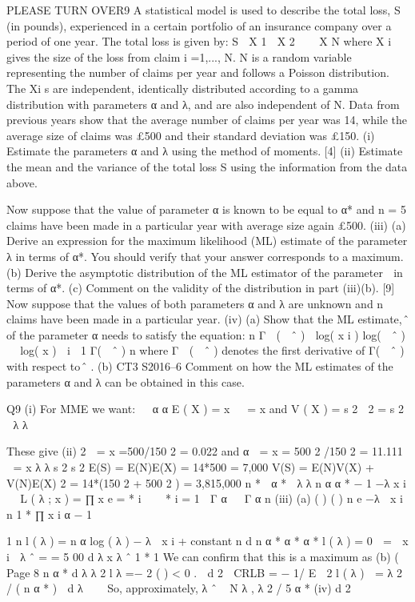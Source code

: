 \documentclass[a4paper,12pt]{article}
\begin{document}
\begin{enumerate}
PLEASE TURN OVER9
A statistical model is used to describe the total loss, S (in pounds), experienced in a
certain portfolio of an insurance company over a period of one year. The total loss is
given by:
S  X 1  X 2    X N
where X i gives the size of the loss from claim i =1,..., N. N is a random variable
representing the number of claims per year and follows a Poisson distribution. The
Xi s are independent, identically distributed according to a gamma distribution with
parameters α and λ, and are also independent of N.
Data from previous years show that the average number of claims per year was 14,
while the average size of claims was £500 and their standard deviation was £150.
(i) Estimate the parameters α and λ using the method of moments.
[4]
(ii) Estimate the mean and the variance of the total loss S using the information
from the data above.

Now suppose that the value of parameter α is known to be equal to α* and
n = 5 claims have been made in a particular year with average size again £500.
(iii)
(a) Derive an expression for the maximum likelihood (ML) estimate of
the parameter λ in terms of α*. You should verify that your answer
corresponds to a maximum.
(b) Derive the asymptotic distribution of the ML estimator of the
parameter  in terms of α*.
(c) Comment on the validity of the distribution in part (iii)(b).
[9]
Now suppose that the values of both parameters α and λ are unknown and n claims
have been made in a particular year.
(iv)
(a)
Show that the ML estimate, ̂ of the parameter α needs to satisfy the
equation:
n
Γ  (  ˆ )
 log( x i )
log(  ˆ ) 
 log( x )  i  1
Γ(  ˆ )
n
where Γ  (  ˆ ) denotes the first derivative of Γ(  ˆ ) with respect to ̂ .
(b)
CT3 S2016–6
Comment on how the ML estimates of the parameters α and λ can be
obtained in this case.

Q9
(i)
For MME we want:


α
α
E ( X ) = x   = x and V ( X ) = s 2  2 = s 2

λ
λ

These give
(ii)
2
 = x =500/150 2 = 0.022 and α
 = x = 500 2 /150 2 = 11.111
 = x λ
λ
s 2
s 2 
E(S) = E(N)E(X) = 14*500 = 7,000 
V(S) = E(N)V(X) + V(N)E(X) 2 = 14*(150 2 + 500 2 ) = 3,815,000 
n
*
 α *

λ
λ n α
α * − 1 −λ x i 

L ( λ ; x ) = ∏
x
e
=
* i

 
*
i = 1  Γ α

 Γ α
n
(iii)
(a)
( )
{ ( ) }
n
e
−λ  x i n
1
*
∏ x i α − 1

1
n
l ( λ ) = n α log ( λ ) − λ  x i + constant 
n
d
n α *
α * α *
l ( λ ) = 0 
=  x i  λ ˆ =
=
5 00
d λ
x
λ ˆ
1 
*
1
We can confirm that this is a maximum as
(b)
(
Page 8
n α *
d λ λ 2
l λ =−
2 ( )
< 0 .
 d 2

CRLB = − 1/ E  2 l ( λ )  = λ 2 / ( n α * )
 d λ



So, approximately, λ ˆ ~ N λ , λ 2 / 5 α *
(iv)
d 2



\end{enumerate}
\end{document}
